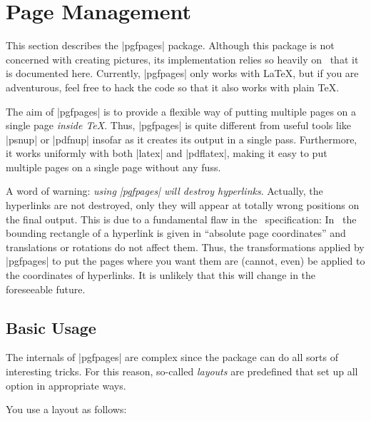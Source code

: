 %
%
%


\section{Page Management}

This section describes the |pgfpages| package. Although this package
is not concerned with creating pictures, its implementation relies so
heavily on \pgfname\ that it is documented here. Currently, |pgfpages|
only works with \LaTeX, but if you are adventurous, feel free to hack
the code so that it also works with plain \TeX.

The aim of |pgfpages| is to provide a flexible way of putting multiple
pages on a single page \emph{inside \TeX}. Thus, |pgfpages| is quite
different from useful tools like |psnup| or |pdfnup| insofar as it
creates its output in a single pass. Furthermore, it works uniformly
with both |latex| and |pdflatex|, making it easy to put multiple pages
on a single page without any fuss.

A word of warning: \emph{using |pgfpages| will destroy
  hyperlinks}. Actually, the hyperlinks are not destroyed, only they
will appear at totally wrong positions on the final output. This is
due to a fundamental flaw in the \pdf\ specification: In \pdf\ the
bounding rectangle of a hyperlink is given in ``absolute
page coordinates'' and translations or rotations do not affect
them. Thus, the transformations applied by |pgfpages| to put the pages
where you want them are (cannot, even) be applied to the coordinates
of hyperlinks. It is unlikely that this will change in the foreseeable
future.


\subsection{Basic Usage}

The internals of |pgfpages| are complex since the package can do all
sorts of interesting tricks. For this reason, so-called \emph{layouts}
are predefined that set up all option in appropriate ways.

You use a layout as follows:

